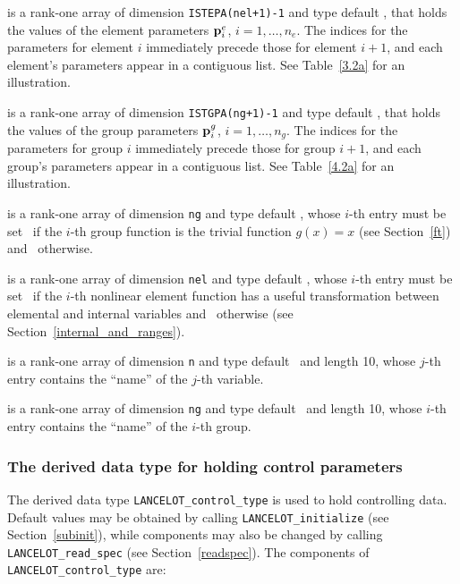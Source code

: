 \documentclass{galahad}
\newcommand{\fullpackagename}{LANC\-E\-LOT}
\begin{document}
\begin{description}
 is a rank-one array of dimension {\tt ISTEPA(nel+1)-1}
and type default \realdp, that holds
the values of the element parameters ${\mathbf{p}}^e_i$, $i = 1, \ldots,
n_e$. The indices for the parameters for element $i$ immediately precede
those for element $i+1$, and each element's parameters appear in a contiguous
list. See Table~\ref{3.2a} for an illustration.

 is a rank-one array of dimension {\tt ISTGPA(ng+1)-1}
and type default \realdp, that holds
the values of the group parameters ${\mathbf{p}}^g_i$, $i = 1, \ldots,
n_g$. The indices for the parameters for group $i$ immediately precede
those for group $i+1$, and each group's parameters appear in a contiguous
list. See Table~\ref{4.2a} for an illustration.

 is a rank-one array of dimension {\tt ng} and type
default \logical, whose $i$-th entry must be
set \true\ if the $i$-th group function is the trivial function
$g(x)=x$ (see Section~\ref{ft}) and \false\ otherwise.

 is a rank-one array of dimension {\tt nel} and type
default \logical, whose $i$-th entry must be
set \true\ if the $i$-th nonlinear element function has a useful
transformation between elemental and internal variables
and \false\ otherwise (see Section~\ref{internal_and_ranges}).

 is a rank-one array of dimension {\tt n} and type
default \character\ and length 10, whose $j$-th entry contains the
``name'' of the $j$-th variable.

 is a rank-one array of dimension {\tt ng} and type
default \character\ and length 10, whose $i$-th entry contains the
``name'' of the $i$-th group.

\end{description}


\subsubsection{The derived data type for holding control
 parameters}\label{typecontrol}
The derived data type
{\tt \fullpackagename\_control\_type}
is used to hold controlling data. Default values may be obtained by calling
{\tt \fullpackagename\_initialize}
(see Section~\ref{subinit}),
while components may also be changed by calling
{\tt \fullpackagename\_read\-\_spec}
(see Section~\ref{readspec}).
The components of
{\tt \fullpackagename\_control\_type}
are:
\end{document}

